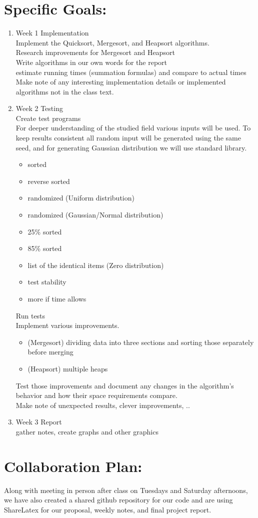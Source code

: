 \documentclass{article}
\begin{document}
\section*{Specific Goals:} 
\begin{enumerate}
\item Week 1  Implementation\\
Implement the Quicksort, Mergesort, and Heapsort algorithms.\\
Research improvements for Mergesort and Heapsort\\
Write algorithms in our own words for the report\\
estimate running times (summation formulas) and compare to actual times\\
Make note of any interesting implementation details or implemented algorithms not in the class text.
\item Week 2  Testing \\
Create test programs\\
For deeper understanding of the studied field various inputs will be used. To keep results consistent all random input will be generated using the same seed, and  for generating Gaussian distribution we will use standard library. 
\begin{itemize} \label{350:testinputs}
\item sorted
\item reverse sorted
\item randomized (Uniform distribution)
\item randomized (Gaussian/Normal distribution)
\item 25\% sorted
\item 85\% sorted
\item list of the identical items (Zero distribution)
\item test stability
\item more if time allows
\end{itemize}
Run tests\\
Implement various improvements.\\
\begin{itemize}
\item (Mergesort) dividing data into three sections and sorting those separately before merging
\item (Heapsort) multiple heaps
\end{itemize}
Test those improvements and document any changes in the algorithm's behavior and how their space requirements compare.\\
Make note of unexpected results, clever improvements, .. 
\item Week 3  Report \\
gather notes, create graphs and other graphics\\
\end{enumerate}
\section*{Collaboration Plan: }
Along with meeting in person after class on Tuesdays and Saturday afternoons, we have also created a shared github repository for our code and are using ShareLatex for our proposal, weekly notes, and final project report.\\
\end{document}
